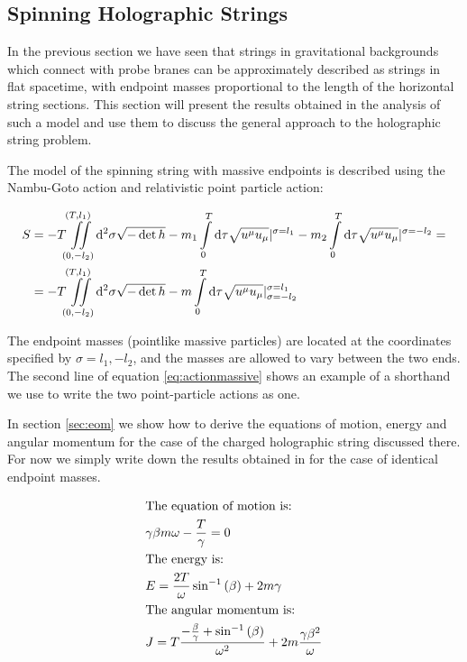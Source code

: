 \documentclass[11pt,a4paper]{article}
\begin{document}
\FloatBarrier
\subsection{Spinning Holographic Strings}
\label{sec:Spinning Holographic Strings}

In the previous section we have seen that strings in gravitational backgrounds which connect with probe branes can be approximately described as strings in flat spacetime, with endpoint masses proportional to the length of the horizontal string sections. This section will present the results obtained in the analysis of such a model and use them to discuss the general approach to the holographic string problem.

The model of the spinning string with massive endpoints is described using the Nambu-Goto action and relativistic point particle action:

\begin{align}
\label{eq:actionmassive}
S&=-T\iint\limits_{(0,-l_{2})}^{(T,l_{1})}\mathrm{d}^{2}\sigma\sqrt{-\det h}-m_1\int\limits_{0}^{T}\mathrm{d}\tau\sqrt{u^{\mu}u_{\mu}}|^{\sigma=l_{1}}-m_2\int\limits_{0}^{T}\mathrm{d}\tau\sqrt{u^{\mu}u_{\mu}}|^{\sigma=-l_{2}}=\notag\\
&=-T\iint\limits_{(0,-l_{2})}^{(T,l_{1})}\mathrm{d}^{2}\sigma\sqrt{-\det h}-m\int\limits_{0}^{T}\mathrm{d}\tau\sqrt{u^{\mu}u_{\mu}}|_{\sigma=-l_{2}}^{\sigma=l_{1}}
\end{align}

The endpoint masses (pointlike massive particles) are located at the coordinates specified by $\sigma=l_1,-l_2$, and the masses are allowed to vary between the two ends. The second line of equation \ref{eq:actionmassive} shows an example of a shorthand we use to write the two point-particle actions as one.

In section \ref{sec:eom} we show how to derive the equations of motion, energy and angular momentum for the case of the charged holographic string discussed there. For now we simply write down the results obtained in \cite{Sonnenschein14} for the case of identical endpoint masses.

\begin{subequations}
\begin{align}
&\text{The equation of motion is:}\notag\\
&\gamma\beta m \omega-\frac{T}{\gamma}=0\\
&\text{The energy is:}\notag\\
&E=\frac{2T}{\omega}\sin^{-1}\left(\beta\right)+2m\gamma\\
&\text{The angular momentum is:}\notag\\
&J=T\frac{-\frac{\beta}{\gamma}+\sin^{-1}\left(\beta\right)}{\omega^{2}}+2m\frac{\gamma\beta^{2}}{\omega}
\end{align}
\end{subequations}
\end{document}
